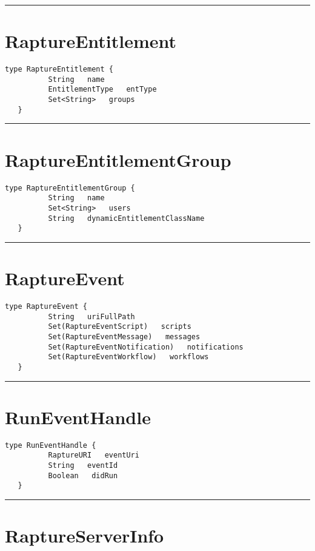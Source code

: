 \rule{12cm}{2pt}
\section{RaptureEntitlement}
\label{type:RaptureEntitlement}

\begin{lstlisting}[style=nonumbers]
   type RaptureEntitlement {
          String   name
          EntitlementType   entType
          Set<String>   groups
   }
\end{lstlisting}

\rule{12cm}{2pt}
\section{RaptureEntitlementGroup}
\label{type:RaptureEntitlementGroup}

\begin{lstlisting}[style=nonumbers]
   type RaptureEntitlementGroup {
          String   name
          Set<String>   users
          String   dynamicEntitlementClassName
   }
\end{lstlisting}

\rule{12cm}{2pt}
\section{RaptureEvent}
\label{type:RaptureEvent}

\begin{lstlisting}[style=nonumbers]
   type RaptureEvent {
          String   uriFullPath
          Set(RaptureEventScript)   scripts
          Set(RaptureEventMessage)   messages
          Set(RaptureEventNotification)   notifications
          Set(RaptureEventWorkflow)   workflows
   }
\end{lstlisting}

\rule{12cm}{2pt}
\section{RunEventHandle}
\label{type:RunEventHandle}

\begin{lstlisting}[style=nonumbers]
   type RunEventHandle {
          RaptureURI   eventUri
          String   eventId
          Boolean   didRun
   }
\end{lstlisting}

\rule{12cm}{2pt}
\section{RaptureServerInfo}
\label{type:RaptureServerInfo}

